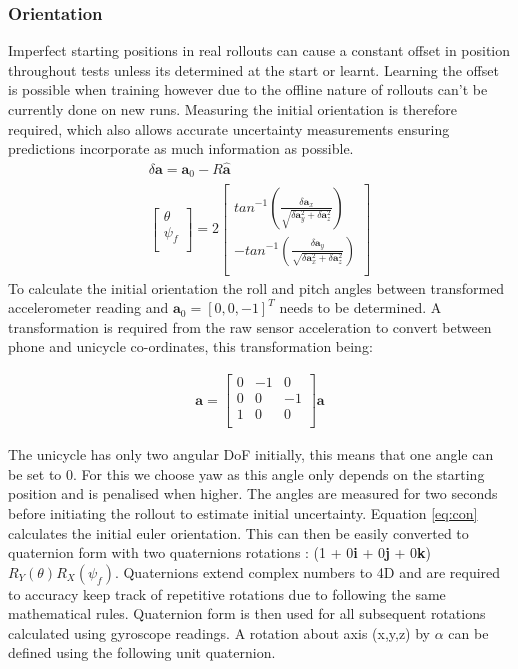 \documentclass[twoside,twocolumn,12pt]{article}
\begin{document}
\subsubsection{Orientation}
Imperfect starting positions in real rollouts can cause a constant offset in position throughout tests unless its determined at the start or learnt. Learning the offset is possible when training however due to the offline nature of rollouts can't be currently done on new runs. Measuring the initial orientation is therefore required, which also allows accurate uncertainty measurements ensuring predictions incorporate as much information as possible.
\begin{equation}
\begin{gathered}
\delta\textbf{a} = \textbf{a}_0 - R\hat{\textbf{a}} \\
\begin{bmatrix}
\theta \\
\psi_f \\
\end{bmatrix} = 
2 \begin{bmatrix}
tan^{-1} ( \frac{\delta\textbf{a}_x}{\sqrt{\delta\textbf{a}_y^2+\delta\textbf{a}_z^2}} )\\
-tan^{-1} ( \frac{\delta\textbf{a}_y}{\sqrt{\delta\textbf{a}_x^2+\delta\textbf{a}_z^2}} )\\
\end{bmatrix}
\label{eq:con}
\end{gathered}
\end{equation}
To calculate the initial orientation the roll and pitch angles between transformed accelerometer reading and $\textbf{a}_0 = [0,0,-1]^T$ needs to be determined. A transformation is required from the raw sensor acceleration to convert between phone and unicycle co-ordinates, this transformation being:

\begin{align*}
\textbf{a} = \begin{bmatrix}
0 & -1 & 0 \\
0 & 0 & -1\\
1 & 0 & 0 \\
\end{bmatrix}
\textbf{a}
\end{align*}



 The unicycle has only two angular DoF initially, this means that one angle can be set to 0. For this we choose yaw as this angle only depends on the starting position and is penalised when higher. The angles are measured for two seconds before initiating the rollout to estimate initial uncertainty.
\newline
Equation \ref{eq:con} calculates the initial euler orientation. This can then be easily converted to quaternion form with two quaternions rotations : (1 + 0\textbf{i}  + 0\textbf{j} + 0\textbf{k})$R_Y(\theta)R_X(\psi_f)$. Quaternions extend complex numbers to 4D and are required to accuracy keep track of repetitive rotations due to following the same mathematical rules. \cite{arsalan} Quaternion form is then used for all subsequent rotations calculated using gyroscope readings.
A rotation about axis (x,y,z) by $\alpha$ can be defined using the following unit quaternion.
\end{document}
